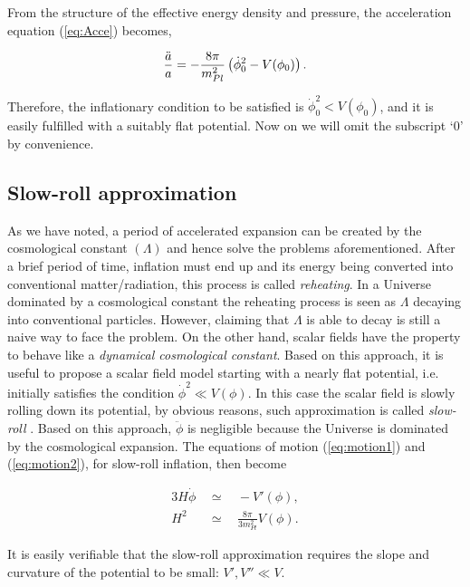 \documentclass{rmaa}
\def\beq{\begin{equation}}
\def\eeq{\end{equation}}
\def\bea{\begin{eqnarray}}
\def\eea{\end{eqnarray}}
\begin{document}
 From the structure of the effective energy density and pressure, the acceleration
  equation (\ref{eq:Acce}) becomes, 
 
 \beq
 {\ddot a \over a} = -{8\pi \over m_{Pl}^2}\left(\dot \phi_0^2-V(\phi_0) \right).
 \eeq
 
 \noindent
 Therefore, the inflationary condition to be satisfied is $\dot \phi_0^2 < V(\phi_0)$, and 
 it is easily fulfilled with a suitably flat potential. Now on we will omit the subscript
 `0' by convenience.



\subsection{Slow-roll approximation}
\vskip 6pt

As we have noted, a period of accelerated expansion can be created by 
the cosmological constant $(\Lambda)$ and hence solve the problems aforementioned.
After a brief period of time, inflation must end up and its energy being converted into conventional
matter/radiation, this process is called \textit{reheating}. In a Universe dominated by a 
cosmological constant the reheating process is seen as $\Lambda$ decaying into 
conventional particles. However, claiming that $\Lambda$ is able to decay is still a 
naive way to face the problem.   
%
On the other hand, scalar fields have the property to behave like a 
\textit{dynamical cosmological constant}. Based on this approach, it is useful to
propose a scalar field model starting with a nearly flat potential, i.e. initially 
satisfies the condition $\dot \phi^2 \ll V(\phi)$. In this case the scalar field is slowly rolling 
down its potential, by obvious reasons, such approximation is called \textit{slow-roll} 
\citep{Liddle92, Liddle94}.  Based on this approach, $\ddot \phi$ is negligible because the Universe is 
 dominated by the cosmological expansion. The equations of motion (\ref{eq:motion1}) 
 and (\ref{eq:motion2}), for slow-roll inflation, then become
 
\bea \label{eq:slow}
3H\dot{\phi} ~~ &\simeq& ~~ -V'(\phi), \\
H^2 ~~ & \simeq& ~~ \frac{8\pi}{3m^2_{Pl}} V(\phi). \label{eq:slow2}
\eea

\noindent
It is easily verifiable that the slow-roll approximation requires the slope 
and curvature of the potential to be small: $V', V'' \ll V$.
\\
\end{document}
